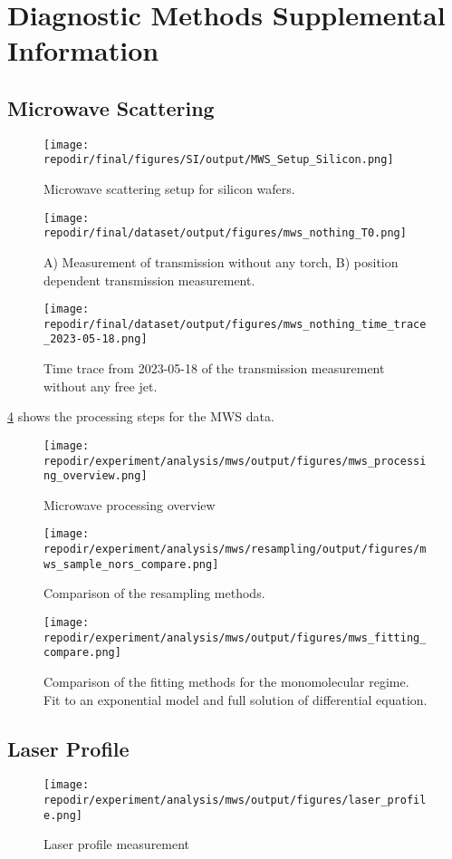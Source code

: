 \section{Diagnostic Methods Supplemental Information}

\subsection{Microwave Scattering}

\begin{figure}[]
\centering
\texttt{[image: \\repodir/final/figures/SI/output/MWS\_Setup\_Silicon.png]}
\caption{Microwave scattering setup for silicon wafers.}
\label{fig:SI_MWS_Setup_Silicon}
\end{figure}

\begin{figure}[]
\centering
\texttt{[image: \\repodir/final/dataset/output/figures/mws\_nothing\_T0.png]}
\caption{A) Measurement of transmission without any torch, B) position dependent transmission measurement.}
\label{fig:SI_MWS}
\end{figure}


\begin{figure}[]
\centering
\texttt{[image: \\repodir/final/dataset/output/figures/mws\_nothing\_time\_trace\_2023-05-18.png]}
\caption{Time trace from 2023-05-18 of the transmission measurement without any free jet.}
\label{fig:SI_MWS}
\end{figure}

\ref{fig:SI_mws_processing_overview} shows the processing steps for the MWS data. 



\begin{figure}[]
\centering
\texttt{[image: \\repodir/experiment/analysis/mws/output/figures/mws\_processing\_overview.png]}
\caption{Microwave processing overview}
\label{fig:SI_mws_processing_overview}
\end{figure}

\begin{figure}
\centering
\texttt{[image: \\repodir/experiment/analysis/mws/resampling/output/figures/mws\_sample\_nors\_compare.png]}
\caption{Comparison of the resampling methods.}
\label{fig:SI_mws_resampling}
\end{figure}


\begin{figure}
\centering
\texttt{[image: \\repodir/experiment/analysis/mws/output/figures/mws\_fitting\_compare.png]}
\caption{Comparison of the fitting methods for the monomolecular regime. Fit to an exponential model and full solution of differential equation. }
\label{fig:SI_mws_fitting_compare}
\end{figure}

\subsection{Laser Profile}


\begin{figure}[]
\centering
\texttt{[image: \\repodir/experiment/analysis/mws/output/figures/laser\_profile.png]}
\caption{Laser profile measurement}
\label{fig:SI_Laser_Profile}
\end{figure}